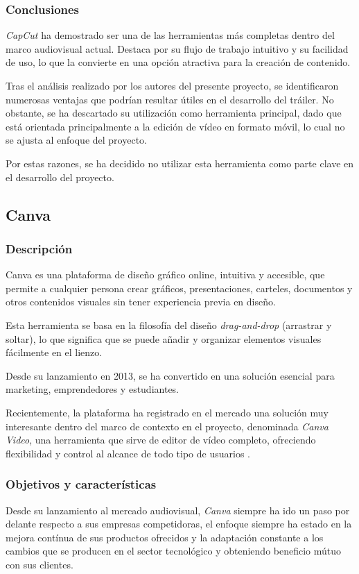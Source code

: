 \subsubsection{Conclusiones}
\textit{CapCut} ha demostrado ser una de las herramientas más completas dentro del marco audiovisual 
actual. Destaca por su flujo de trabajo intuitivo y su facilidad de uso, lo que la convierte en una 
opción atractiva para la creación de contenido.

Tras el análisis realizado por los autores del presente proyecto, se identificaron numerosas ventajas 
que podrían resultar útiles en el desarrollo del tráiler. No obstante, se ha descartado su 
utilización como herramienta principal, dado que está orientada principalmente a la edición de vídeo 
en formato móvil, lo cual no se ajusta al enfoque del proyecto.

Por estas razones, se ha decidido no utilizar esta herramienta como parte clave en el desarrollo del proyecto.

\subsection{Canva}
\subsubsection{Descripción}

Canva es una plataforma de diseño gráfico online, intuitiva y accesible, que permite a cualquier 
persona crear gráficos, presentaciones, carteles, documentos y otros contenidos visuales sin tener 
experiencia previa en diseño.

Esta herramienta se basa en la filosofía del diseño \textit{drag-and-drop} (arrastrar y soltar), 
lo que significa que se puede añadir y organizar elementos visuales fácilmente en el lienzo.

Desde su lanzamiento en 2013, se ha convertido en una solución esencial para marketing, emprendedores 
y estudiantes.

Recientemente, la plataforma ha registrado en el mercado una solución muy interesante dentro del 
marco de contexto en el proyecto, denominada \textit{Canva Video}, una herramienta que sirve de 
editor de vídeo completo, ofreciendo flexibilidad y control al alcance de todo tipo de usuarios \cite{canva-video}.

\subsubsection{Objetivos y características}
Desde su lanzamiento al mercado audiovisual, \textit{Canva} siempre ha ido un paso por delante 
respecto a sus empresas competidoras, el enfoque siempre ha estado en la mejora contínua de sus 
productos ofrecidos y la adaptación constante a los cambios que se producen en el sector tecnológico y 
obteniendo beneficio mútuo con sus clientes.

